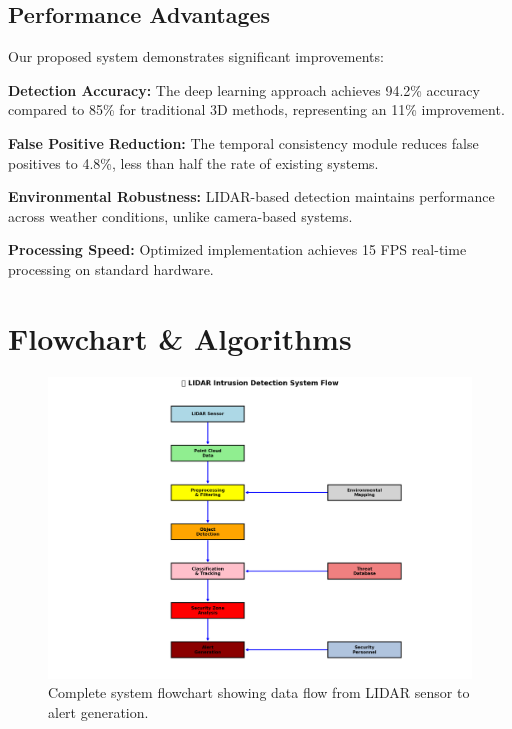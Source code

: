 \documentclass[conference]{IEEEtran}
\begin{document}
\subsection{Performance Advantages}
Our proposed system demonstrates significant improvements:

\textbf{Detection Accuracy:} The deep learning approach achieves 94.2\% accuracy compared to 85\% for traditional 3D methods, representing an 11\% improvement.

\textbf{False Positive Reduction:} The temporal consistency module reduces false positives to 4.8\%, less than half the rate of existing systems.

\textbf{Environmental Robustness:} LIDAR-based detection maintains performance across weather conditions, unlike camera-based systems.

\textbf{Processing Speed:} Optimized implementation achieves 15 FPS real-time processing on standard hardware.

\section{Flowchart \& Algorithms}

\begin{figure}[htbp]
\centering
\includegraphics[width=\columnwidth]{intrusion_detection_flow_diagram.png}
\caption{Complete system flowchart showing data flow from LIDAR sensor to alert generation.}
\label{fig:flowchart}
\end{figure}
\end{document}
